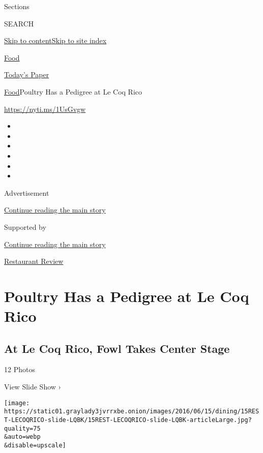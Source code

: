 Sections

SEARCH

\protect\hyperlink{site-content}{Skip to
content}\protect\hyperlink{site-index}{Skip to site index}

\href{https://www.nytimes3xbfgragh.onion/section/food}{Food}

\href{https://myaccount.nytimes3xbfgragh.onion/auth/login?response_type=cookie\&client_id=vi}{}

\href{https://www.nytimes3xbfgragh.onion/section/todayspaper}{Today's
Paper}

\href{/section/food}{Food}\textbar{}Poultry Has a Pedigree at Le Coq
Rico

\url{https://nyti.ms/1UsGvgw}

\begin{itemize}
\item
\item
\item
\item
\item
\item
\end{itemize}

Advertisement

\protect\hyperlink{after-top}{Continue reading the main story}

Supported by

\protect\hyperlink{after-sponsor}{Continue reading the main story}

\href{/column/restaurant-review}{Restaurant Review}

\hypertarget{poultry-has-a-pedigree-at-le-coq-rico}{%
\section{Poultry Has a Pedigree at Le Coq
Rico}\label{poultry-has-a-pedigree-at-le-coq-rico}}

\href{https://www.nytimes3xbfgragh.onion/slideshow/2016/06/15/dining/le-coq-rico-nyc-restaurant-review.html}{}

\hypertarget{at-le-coq-rico-fowl-takes-center-stage}{%
\subsection{At Le Coq Rico, Fowl Takes Center
Stage}\label{at-le-coq-rico-fowl-takes-center-stage}}

12 Photos

View Slide Show ›

\texttt{[image: https://static01.graylady3jvrrxbe.onion/images/2016/06/15/dining/15REST-LECOQRICO-slide-LQBK/15REST-LECOQRICO-slide-LQBK-articleLarge.jpg?quality=75\\\&auto=webp\\\&disable=upscale]}

